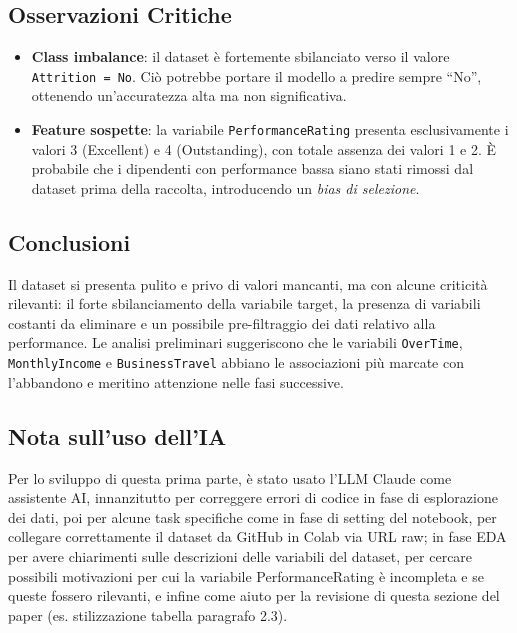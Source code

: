 \documentclass[12pt, a4paper]{article}
\begin{document}
\subsection{Osservazioni Critiche}
 
\begin{itemize}
    \item \textbf{Class imbalance}: il dataset è fortemente sbilanciato verso il valore \texttt{Attrition = No}. Ciò potrebbe portare il modello a predire sempre ``No'', ottenendo un'accuratezza alta ma non significativa.
 
    \item \textbf{Feature sospette}: la variabile \texttt{PerformanceRating} presenta esclusivamente i valori 3 (Excellent) e 4 (Outstanding), con totale assenza dei valori 1 e 2. È probabile che i dipendenti con performance bassa siano stati rimossi dal dataset prima della raccolta, introducendo un \textit{bias di selezione}.

\end{itemize}
 
\subsection{Conclusioni}
 
Il dataset si presenta pulito e privo di valori mancanti, ma con alcune criticità rilevanti: il forte sbilanciamento della variabile target, la presenza di variabili costanti da eliminare e un possibile pre-filtraggio dei dati relativo alla performance. Le analisi preliminari suggeriscono che le variabili \texttt{OverTime}, \texttt{MonthlyIncome} e \texttt{BusinessTravel} abbiano le associazioni più marcate con l'abbandono e meritino attenzione nelle fasi successive.


\subsection*{Nota sull'uso dell'IA}
Per lo sviluppo di questa prima parte, è stato usato l’LLM Claude come assistente AI, innanzitutto per correggere errori di codice in fase di esplorazione dei dati, poi per alcune task specifiche come in fase di setting del notebook, per collegare correttamente il dataset da GitHub in Colab via URL raw; in fase EDA per avere chiarimenti sulle descrizioni delle variabili del dataset, per cercare possibili motivazioni per cui la variabile PerformanceRating è incompleta e se queste fossero rilevanti, e infine come aiuto per la revisione di questa sezione del paper (es. stilizzazione tabella paragrafo 2.3).
\end{document}
